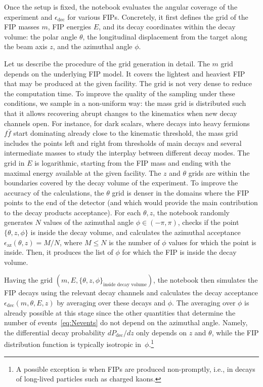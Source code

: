 \documentclass[
    aps,prd,
    twocolumn,
    nofootinbib,
    superscriptaddress,
]{revtex4}
\begin{document}
Once the setup is fixed, the notebook evaluates the angular coverage of the experiment and $\epsilon_{\text{dec}}$ for various FIPs. Concretely, it first defines the grid of the FIP masses $m$, FIP energies $E$, and its decay coordinates within the decay volume: the polar angle $\theta$, the longitudinal displacement from the target along the beam axis $z$, and the azimuthal angle $\phi$. 

Let us describe the procedure of the grid generation in detail. The $m$ grid depends on the underlying FIP model. It covers the lightest and heaviest FIP that may be produced at the given facility. The grid is not very dense to reduce the computation time. To improve the quality of the sampling under these conditions, we sample in a non-uniform way: the mass grid is distributed such that it allows recovering abrupt changes to the kinematics when new decay channels open. For instance, for dark scalars, where decays into heavy fermions $f\bar{f}$ start dominating already close to the kinematic threshold, the mass grid includes the points left and right from thresholds of main decays and several intermediate masses to study the interplay between different decay modes. The grid in $E$ is logarithmic, starting from the FIP mass and ending with the maximal energy available at the given facility. The $z$ and $\theta$ grids are within the boundaries covered by the decay volume of the experiment. To improve the accuracy of the calculations, the $\theta$ grid is denser in the domains where the FIP points to the end of the detector (and which would provide the main contribution to the decay products acceptance). For each $\theta,z$, the notebook randomly generates $N$ values of the azimuthal angle $\phi \in (-\pi,\pi)$, checks if the point $\{\theta,z,\phi\}$ is inside the decay volume, and calculates the azimuthal acceptance $\epsilon_{\text{az}}(\theta,z) = M/N$, where $M\leq N$ is the number of $\phi$ values for which the point is inside. Then, it produces the list of $\phi$ for which the FIP is inside the decay volume.

Having the grid $(m,E,\{\theta,z,\phi
\}_{\text{inside decay volume}})$, the notebook then simulates the FIP decays using the relevant decay channels and calculates the decay acceptance $\epsilon_{\text{dec}}(m,\theta,E,z)$ by averaging over these decays and $\phi$. The averaging over $\phi$ is already possible at this stage since the other quantities that determine the number of events~\eqref{eq:Nevents} do not depend on the azimuthal angle. Namely, the differential decay probability $dP_{\text{dec}}/dz$ only depends on $z$ and $\theta$, while the FIP distribution function is typically isotropic in~$\phi$.\footnote{A possible exception is when FIPs are produced non-promptly, i.e., in decays of long-lived particles such as charged kaons.}
\end{document}
